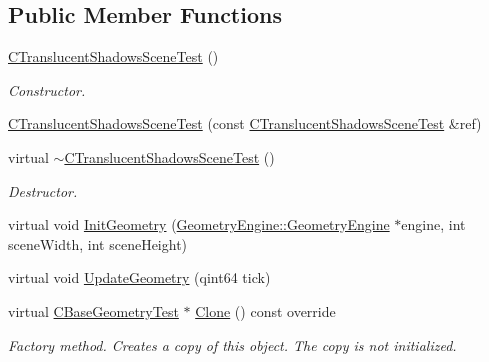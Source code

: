 \subsection*{Public Member Functions}
\begin{DoxyCompactItemize}
\item 
\mbox{\label{class_unit_test_1_1_c_translucent_shadows_scene_test_ad2d9b49d281b31b3e3ec1112136b300e}} 
\mbox{\hyperlink{class_unit_test_1_1_c_translucent_shadows_scene_test_ad2d9b49d281b31b3e3ec1112136b300e}{C\+Translucent\+Shadows\+Scene\+Test}} ()
\begin{DoxyCompactList}\small\item\em Constructor. \end{DoxyCompactList}\item 
\mbox{\hyperlink{class_unit_test_1_1_c_translucent_shadows_scene_test_a6412765b1bb5f10b01a0a8994426a617}{C\+Translucent\+Shadows\+Scene\+Test}} (const \mbox{\hyperlink{class_unit_test_1_1_c_translucent_shadows_scene_test}{C\+Translucent\+Shadows\+Scene\+Test}} \&ref)
\item 
\mbox{\label{class_unit_test_1_1_c_translucent_shadows_scene_test_aefd1cd3900006be9adf2b389a4109eb2}} 
virtual \mbox{\hyperlink{class_unit_test_1_1_c_translucent_shadows_scene_test_aefd1cd3900006be9adf2b389a4109eb2}{$\sim$\+C\+Translucent\+Shadows\+Scene\+Test}} ()
\begin{DoxyCompactList}\small\item\em Destructor. \end{DoxyCompactList}\item 
virtual void \mbox{\hyperlink{class_unit_test_1_1_c_translucent_shadows_scene_test_a8fcc93b0e2bf513e85f7cda97071cfa9}{Init\+Geometry}} (\mbox{\hyperlink{class_geometry_engine_1_1_geometry_engine}{Geometry\+Engine\+::\+Geometry\+Engine}} $\ast$engine, int scene\+Width, int scene\+Height)
\item 
virtual void \mbox{\hyperlink{class_unit_test_1_1_c_translucent_shadows_scene_test_a914c4b6892c7a28a66fbbaf9e96ba73a}{Update\+Geometry}} (qint64 tick)
\item 
\mbox{\label{class_unit_test_1_1_c_translucent_shadows_scene_test_a2f8d6f0bcc73ca55623753067e03b84d}} 
virtual \mbox{\hyperlink{class_unit_test_1_1_c_base_geometry_test}{C\+Base\+Geometry\+Test}} $\ast$ \mbox{\hyperlink{class_unit_test_1_1_c_translucent_shadows_scene_test_a2f8d6f0bcc73ca55623753067e03b84d}{Clone}} () const override
\begin{DoxyCompactList}\small\item\em Factory method. Creates a copy of this object. The copy is not initialized. \end{DoxyCompactList}\end{DoxyCompactItemize}
